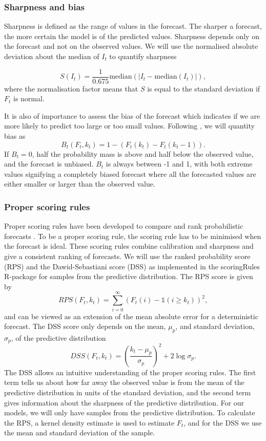 \documentclass[12pt]{article}
\begin{document}
\subsubsection{Sharpness and bias}
Sharpness is defined as the range of values in the forecast. The sharper a forecast, the more certain the model is of the predicted values. Sharpness depends only on the forecast and not on the observed values. We will use the normalised absolute deviation about the median of $I_t$ to quantify sharpness

\[ S(I_t) = \frac{1}{0.675} \text{median}(|I_t - \text{median}(I_t)|),\]
where the normalisation factor means that $S$ is equal to the standard deviation if $F_t$ is normal.

It is also of importance to assess the bias of the forecast which indicates if we are more likely to predict too large or too small values. Following \cite{funkAssessingPerformanceRealtime2019}, we will quantity bias as
\[B_t(F_t, k_t) = 1 - (F_t(k_t) - F_t(k_t - 1)).\]
If $B_t=0$, half the probability mass is above and half below the observed value, and the forecast is unbiased. $B_t$ is always between -1 and 1, with both extreme values signifying a completely biased forecast where all the forecasted values are either smaller or larger than the observed value.

\subsubsection{Proper scoring rules}
Proper scoring rules have been developed to compare and rank probabilistic forecasts \cite{gneitingStrictlyProperScoring2007}. To be a proper scoring rule, the scoring rule has to be minimised when the forecast is ideal. These scoring rules combine calibration and sharpness and give a consistent ranking of forecasts. We will use the ranked probability score (RPS) and the Dawid-Sebastiani score (DSS) as implemented in the scoringRules R-package \cite{jordanEvaluatingProbabilisticForecasts2018} for samples from the predictive distribution. The RPS score is given by 
\[RPS(F_t,k_t) = \sum_{i=0}^\infty(F_t(i) - \mathds{1}(i \geq k_t))^2, \]
and can be viewed as an extension of the mean absolute error for a deterministic forecast. The DSS score only depends on the mean, $\mu_p$, and standard deviation, $\sigma_p$, of the predictive distribution
\[DSS(F_t, k_t) = \left(\frac{k_t- \mu_p}{\sigma_p}\right)^2 + 2\log\sigma_p.\]
The DSS allows an intuitive understanding of the proper scoring rules. The first term tells us about how far away the observed value is from the mean of the predictive distribution in units of the standard deviation, and the second term gives information about the sharpness of the predictive distribution. For our models, we will only have samples from the predictive distribution. To calculate the RPS, a kernel density estimate is used to estimate $F_t$, and for the DSS we use the mean and standard deviation of the sample. 
\end{document}
